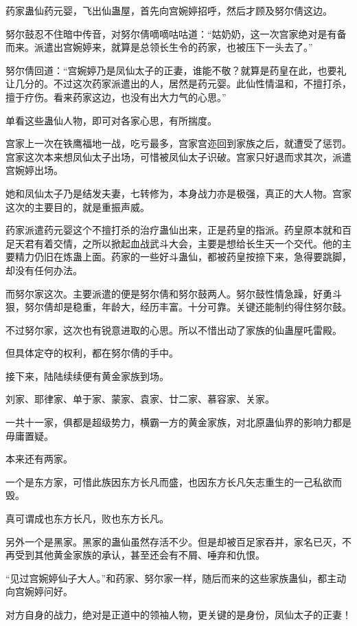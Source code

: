 \begin{this_body}
药家蛊仙药元婴，飞出仙蛊屋，首先向宫婉婷招呼，然后才顾及努尔倩这边。

努尔鼓忍不住暗中传音，对努尔倩嘀嘀咕咕道：“姑奶奶，这一次宫家绝对是有备而来。派遣出宫婉婷来，就算是总领长生令的药家，也被压下一头去了。”

努尔倩回道：“宫婉婷乃是凤仙太子的正妻，谁能不敬？就算是药皇在此，也要礼让几分的。不过这次药家派遣出的人，居然是药元婴。此仙性情温和，不擅打杀，擅于疗伤。看来药家这边，也没有出大力气的心思。”

单看这些蛊仙人物，即可对各家心思，有所揣度。

宫家上一次在铁鹰福地一战，吃亏最多，宫家宫迩回到家族之后，就遭受了惩罚。宫家这次本来想凤仙太子出场，可惜被凤仙太子识破。宫家只好退而求其次，派遣宫婉婷出场。

她和凤仙太子乃是结发夫妻，七转修为，本身战力亦是极强，真正的大人物。宫家这次的主要目的，就是重振声威。

药家派遣药元婴这个不擅打杀的治疗蛊仙出来，正是药皇的指派。药皇原本就和百足天君有着交情，之所以掀起血战武斗大会，主要是想给长生天一个交代。他的主要精力仍旧在炼蛊上面。药家的一些好斗蛊仙，都被药皇按捺下来，急得要跳脚，却没有任何办法。

而努尔家这次。主要派遣的便是努尔倩和努尔鼓两人。努尔鼓性情急躁，好勇斗狠，努尔倩却是稳重，年龄大，经历丰富。十分可靠。关键还能制约得住努尔鼓。

不过努尔家，这次也有锐意进取的心思。所以不惜出动了家族的仙蛊屋吒雷殿。

但具体定夺的权利，都在努尔倩的手中。

接下来，陆陆续续便有黄金家族到场。

刘家、耶律家、单于家、蒙家、袁家、廿二家、慕容家、关家。

一共十一家，俱都是超级势力，横霸一方的黄金家族，对北原蛊仙界的影响力都是毋庸置疑。

本来还有两家。

一个是东方家，可惜此族因东方长凡而盛，也因东方长凡矢志重生的一己私欲而毁。

真可谓成也东方长凡，败也东方长凡。

另外一个是黑家。黑家的蛊仙虽然存活不少。但是却被百足家吞并，家名已灭，不再受到其他黄金家族的承认，甚至还会有不屑、唾弃和仇恨。

“见过宫婉婷仙子大人。”和药家、努尔家一样，随后而来的这些家族蛊仙，都主动向宫婉婷问好。

对方自身的战力，绝对是正道中的领袖人物，更关键的是身份，凤仙太子的正妻！


\end{this_body}
